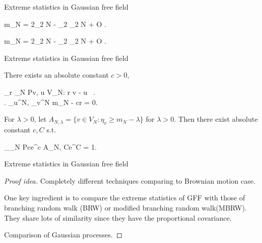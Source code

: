 \documentclass{beamer}
\begin{document}
\begin{frame}{Extreme statistics in Gaussian free field}
	\begin{Thm}
		\bequ
			m_N = 2\log_2 N - \log_2 \log_2 N + O \rp.
		\eequ
	\end{Thm}
	\begin{Thm}
		\bequ
			m_N = 2\log_2 N - \log_2 \log_2 N + O \rp.
		\eequ
	\end{Thm}
\end{frame}


\begin{frame}{Extreme statistics in Gaussian free field}
	\begin{Thm}
		There exists an absolute constant $c > 0$, 
		\bequ
			\begin{aligned}
				\lim_{r \rightarrow \infty}\lim_{N \rightarrow \infty} P\lp  \exists v, u \in V_N: r \leq \lv v - u \rv \leq {} \  \right. \\ \left. \eta_u^N, \eta_v^N \geq m_N - c\log\log r  \rp = 0.
			\end{aligned}
		\eequ
		\end{Thm}
		\begin{Thm}
		For $\lambda > 0$, let $A_{N, \lambda} = \{ v \in V_N: \eta_v \geq m_N - \lambda \}$ for $\lambda > 0$. Then there exist absolute constant $c, C$ s.t.
		\bequ
			\begin{aligned}
				\lim_{\lambda \rightarrow \infty}\lim_{N \rightarrow \infty} P\lp ce^{c\lambda} \leq \lv A_{N, \lambda} \rv \leq Ce^{C\lambda}  \rp = 1.
			\end{aligned}
		\eequ
		\end{Thm}
\end{frame}


\begin{frame}{Extreme statistics in Gaussian free field}
	\begin{proof}[Proof idea]
		Completely different techniques comparing to Brownian motion case. 
		\par
		One key ingredient is to compare the extreme statistics of GFF with those of branching random walk (BRW) or modified branching random walk\footnotemark (MBRW). They share lots of similarity since they have the proportional covariance.
		\par
		Comparison of Gaussian processes.
	\end{proof}
\end{frame}
\end{document}
